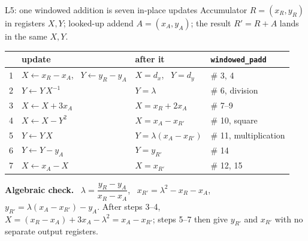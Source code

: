 \documentclass[aspectratio=169,11pt]{beamer}
\begin{document}
\begin{frame}{L5: one windowed addition is seven in-place updates}
  {\small Accumulator $R=(x_R,y_R)$ in registers $X,Y$; looked-up addend $A=(x_A,y_A)$; the result $R'=R+A$ lands in the same $X,Y$.}
  \vskip1mm
  \centering\small
  \renewcommand{\arraystretch}{1.12}
  \begin{tabular}{@{}rlll@{}}
    \toprule
    & update & after it & \texttt{windowed\_padd} \\
    \midrule
    1 & $X\leftarrow x_R-x_A$, \ $Y\leftarrow y_R-y_A$ & $X=d_x$, \ $Y=d_y$ & \# 3, 4 \\
    2 & $Y\leftarrow Y\,X^{-1}$ & $Y=\lambda$ & \# 6, division \\
    3 & $X\leftarrow X+3x_A$ & $X=x_R+2x_A$ & \# 7--9 \\
    4 & $X\leftarrow X-Y^2$ & $X=x_A-x_{R'}$ & \# 10, square \\
    5 & $Y\leftarrow Y\,X$ & $Y=\lambda(x_A-x_{R'})$ & \# 11, multiplication \\
    6 & $Y\leftarrow Y-y_A$ & $Y=y_{R'}$ & \# 14 \\
    7 & $X\leftarrow x_A-X$ & $X=x_{R'}$ & \# 12, 15 \\
    \bottomrule
  \end{tabular}\par
  \vskip2mm
  \raggedright
  \begin{greyblock}[fontupper=\small]
    \textbf{Algebraic check.} \ $\lambda=\dfrac{y_R-y_A}{x_R-x_A}$, \ $x_{R'}=\lambda^2-x_R-x_A$, \ $y_{R'}=\lambda(x_A-x_{R'})-y_A$. After steps 3--4, $X=(x_R-x_A)+3x_A-\lambda^2=x_A-x_{R'}$; steps 5--7 then give $y_{R'}$ and $x_{R'}$ with no separate output registers.
  \end{greyblock}
\end{frame}
\end{document}

